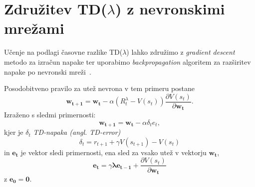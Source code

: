 \documentclass[a4paper, oneside, 12pt]{report}
\begin{document}



\section{Združitev TD($\lambda$) z nevronskimi mrežami}
Učenje na podlagi časovne razlike TD($\lambda$) lahko združimo z {\em gradient descent} metodo za izračun napake ter uporabimo {\em backpropagation} algoritem za razširitev napake po nevronski mreži~\cite{TDANNForStrategicControlProblems}.

Posodobitveno pravilo za utež nevrona v tem primeru postane
\begin{equation}
\mathbf{w_{t+1}} = \mathbf{w_t} - \alpha (R_t^\lambda - V(s_t)) \frac{\partial V(s_t)}{\partial \mathbf{w_t}}.
\end{equation}
Izraženo s sledmi primernosti:
\begin{equation}
\mathbf{w_{t+1}} = \mathbf{w_t} - \alpha \delta_t e_t,
\end{equation}
kjer je $\delta_t$ {\em TD-napaka (angl. TD-error)}
\begin{equation}
\delta_t = r_{t+1} + \gamma V(s_{t+1}) - V(s_t)
\end{equation}
in $\mathbf{e_t}$ je vektor sledi primernosti, ena sled za vsako utež v vektorju $\mathbf{w_t}$,
\begin{equation}
\mathbf{e_t} = \gamma \mathbf{\lambda e_{t-1}} + \frac{\partial V(s_t)}{\partial \mathbf{w_t}}
\end{equation}
z $\mathbf{e_0} = \mathbf{0}$.
\end{document}
